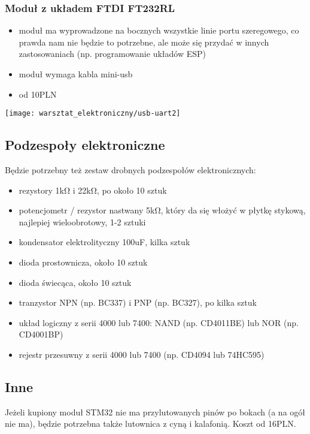 \documentclass{pdfBooklets}
\newcommand\zaleta{\item[\textbf{\ttfamily +}]}
\newcommand\wada{\item[\textbf{\ttfamily -}]}
\newcommand\info{\item[\textbf{\ttfamily *}]}
\begin{document}
	\subsubsection{Moduł z układem FTDI FT232RL}
	\parbox[c]{0.65\textwidth}{
		\begin{itemize}
			\zaleta moduł ma wyprowadzone na bocznych wszystkie linie portu szeregowego, co prawda nam nie będzie to potrzebne, ale może się przydać w innych zastosowaniach (np. programowanie układów ESP)
			\wada moduł wymaga kabla mini-usb
			\info od 10PLN
		\end{itemize}
	}
	\parbox[c]{0.33\textwidth}{
		\begin{flushright} \texttt{[image: warsztat\_elektroniczny/usb-uart2]} \end{flushright}
	}
	
\subsection{Podzespoły elektroniczne}

Będzie potrzebny też zestaw drobnych podzespołów elektronicznych:
\begin{itemize}
	\item rezystory 1kΩ i 22kΩ, po około 10 sztuk
	\item potencjometr / rezystor nastwany 5kΩ, który da się włożyć w płytkę stykową, najlepiej wieloobrotowy, 1-2 sztuki
	\item kondensator elektrolityczny 100uF, kilka sztuk
	
	\item dioda prostownicza, około 10 sztuk
	\item dioda świecąca, około 10 sztuk
	\item tranzystor NPN (np. BC337) i PNP (np. BC327), po kilka sztuk
	
	\item układ logiczny z serii 4000 lub 7400: NAND (np. CD4011BE) lub NOR (np. CD4001BP)
	\item rejestr przesuwny z serii 4000 lub 7400 (np. CD4094 lub 74HC595)
\end{itemize}

\subsection{Inne}
Jeżeli kupiony moduł STM32 nie ma przylutowanych pinów po bokach (a na ogół nie ma), będzie potrzebna także lutownica z cyną i kalafonią. Koszt od 16PLN.
\end{document}
